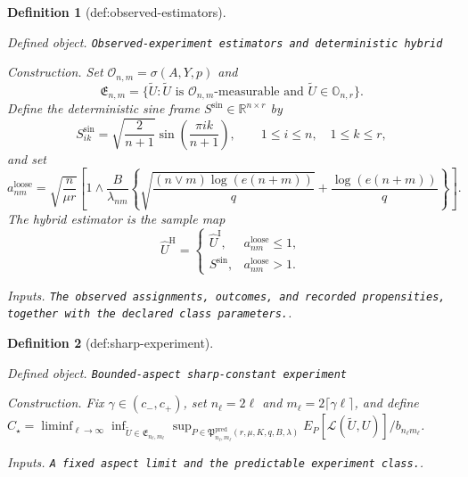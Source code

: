 \documentclass{article}
\newtheorem{definition}{Definition}
\begin{document}
\begin{definition}[def:observed-estimators]\label{def:observed-estimators}
\par\smallskip\noindent\emph{Defined object.} \texttt{Observed-\allowbreak{}experiment estimators and deterministic hybrid}
\par\smallskip\noindent\emph{Construction.} Set \(\mathcal O_{n,m}=\sigma(A,Y,p)\) and
\[
 \mathfrak E_{n,m}=\{\widetilde U:\widetilde U\text{ is }\mathcal O_{n,m}\text{-measurable and }\widetilde U\in\mathbb O_{n,r}\}.
\]
Define the deterministic sine frame \(S^{\mathrm{sin}}\in\mathbb R^{n\times r}\) by
\[
 S^{\mathrm{sin}}_{ik}=\sqrt{\frac{2}{n+1}}\sin\!\left(\frac{\pi ik}{n+1}\right),
 \qquad 1\le i\le n,\quad 1\le k\le r,
\]
and set
\[
 a^{\mathrm{loose}}_{nm}=\sqrt{\frac n{\mu r}}\left[1\wedge
 \frac B{\lambda_{nm}}\left\{
 \sqrt{\frac{(n\vee m)\log(e(n+m))}{q}}+
 \frac{\log(e(n+m))}{q}\right\}\right].
\]
The hybrid estimator is the sample map
\[
 \widehat U^{\mathrm H}=\begin{cases}
 \widehat U^{\mathrm I},&a^{\mathrm{loose}}_{nm}\le1,\\
 S^{\mathrm{sin}},&a^{\mathrm{loose}}_{nm}>1.
 \end{cases}
\]
\par\smallskip\noindent\emph{Inputs.} \texttt{The observed assignments,\allowbreak{} outcomes,\allowbreak{} and recorded propensities,\allowbreak{} together with the declared class parameters.}.
\end{definition}

\begin{definition}[def:sharp-experiment]\label{def:sharp-experiment}
\par\smallskip\noindent\emph{Defined object.} \texttt{Bounded-\allowbreak{}aspect sharp-\allowbreak{}constant experiment}
\par\smallskip\noindent\emph{Construction.} Fix \(\gamma\in(c_-,c_+)\), set \(n_\ell=2\ell\) and \(m_\ell=2\lceil\gamma\ell\rceil\), and define \(C_\star=\liminf_{\ell\to\infty}\inf_{\widetilde U\in\mathfrak E_{n_\ell,m_\ell}}\sup_{P\in\mathfrak P^{\mathrm{pred}}_{n_\ell,m_\ell}(r,\mu,K,q,B,\lambda)}E_P[\mathcal L(\widetilde U,U)]/b_{n_\ell m_\ell}\).
\par\smallskip\noindent\emph{Inputs.} \texttt{A fixed aspect limit and the predictable experiment class.}.
\end{definition}
\end{document}
